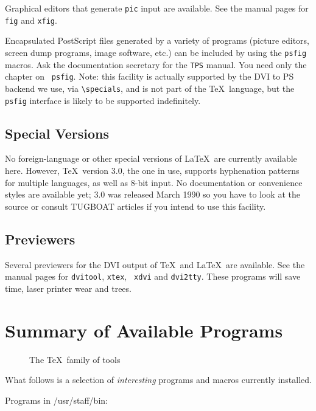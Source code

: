 Graphical editors that generate \verb|pic| input are available.
See the manual pages for \verb|fig| and \verb|xfig|.

Encapsulated PostScript files generated by a variety of programs
(picture editors, screen dump programs, image software, etc.) can be
included by using the {\tt psfig} macros. Ask the documentation
secretary for the {\tt TPS} manual. You need only the chapter on {\tt
psfig}. Note: this facility is actually supported by the DVI to PS
backend we use, via \verb|\specials|, and is not part of the
\TeX\ language, but the {\tt psfig} interface is likely to be supported
indefinitely.

\subsection{Special Versions}

No foreign-language or other special versions of \LaTeX\ are currently
available here. However, \TeX\ version 3.0, the one in use, supports
hyphenation patterns for multiple languages, as well as 8-bit input.
No documentation or convenience styles are available yet; 3.0 was
released March 1990 so you have to look at the source or consult
TUGBOAT articles if you intend to use this facility.

\subsection{Previewers}

Several previewers for the DVI output of \TeX\ and \LaTeX\ are
available.  See the manual pages for {\tt dvitool}, {\tt xtex}, {\tt
xdvi} and {\tt dvi2tty}.  These programs will save time, laser printer
wear and trees.

\section{Summary of Available Programs}

\begin{figure}[tbhp]

\caption{The \TeX\ family of tools}
\end{figure}

What follows is a selection of {\em interesting} programs and
macros currently installed.

Programs in /usr/staff/bin:

